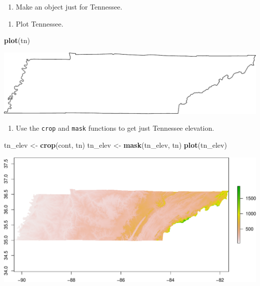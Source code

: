 \documentclass[
]{book}
\newenvironment{Shaded}{\begin{snugshade}}{\end{snugshade}}
\newcommand{\DecValTok}[1]{\textcolor[rgb]{0.00,0.00,0.81}{#1}}
\newcommand{\KeywordTok}[1]{\textcolor[rgb]{0.13,0.29,0.53}{\textbf{#1}}}
\newcommand{\NormalTok}[1]{#1}
\newcommand{\OperatorTok}[1]{\textcolor[rgb]{0.81,0.36,0.00}{\textbf{#1}}}
\newcommand{\StringTok}[1]{\textcolor[rgb]{0.31,0.60,0.02}{#1}}
\providecommand{\tightlist}{%
  \setlength{\itemsep}{0pt}\setlength{\parskip}{0pt}}
\begin{document}
\begin{enumerate}
\def\labelenumi{\arabic{enumi}.}
\setcounter{enumi}{12}
\tightlist
\item
  Make an object just for Tennessee.
\end{enumerate}

\begin{Shaded}
\end{Shaded}

\begin{enumerate}
\def\labelenumi{\arabic{enumi}.}
\setcounter{enumi}{13}
\tightlist
\item
  Plot Tennessee.
\end{enumerate}

\begin{Shaded}
\begin{Highlighting}[]
\KeywordTok{plot}\NormalTok{(tn)}
\end{Highlighting}
\end{Shaded}

\includegraphics{figures/unnamed-chunk-559-1.pdf}

\begin{enumerate}
\def\labelenumi{\arabic{enumi}.}
\setcounter{enumi}{14}
\tightlist
\item
  Use the \texttt{crop} and \texttt{mask} functions to get just Tennessee elevation.
\end{enumerate}

\begin{Shaded}
\begin{Highlighting}[]
\NormalTok{tn_elev <-}\StringTok{ }\KeywordTok{crop}\NormalTok{(cont, tn)}
\NormalTok{tn_elev <-}\StringTok{ }\KeywordTok{mask}\NormalTok{(tn_elev, tn)}
\KeywordTok{plot}\NormalTok{(tn_elev)}
\end{Highlighting}
\end{Shaded}

\includegraphics{figures/unnamed-chunk-560-1.pdf}
\end{document}
